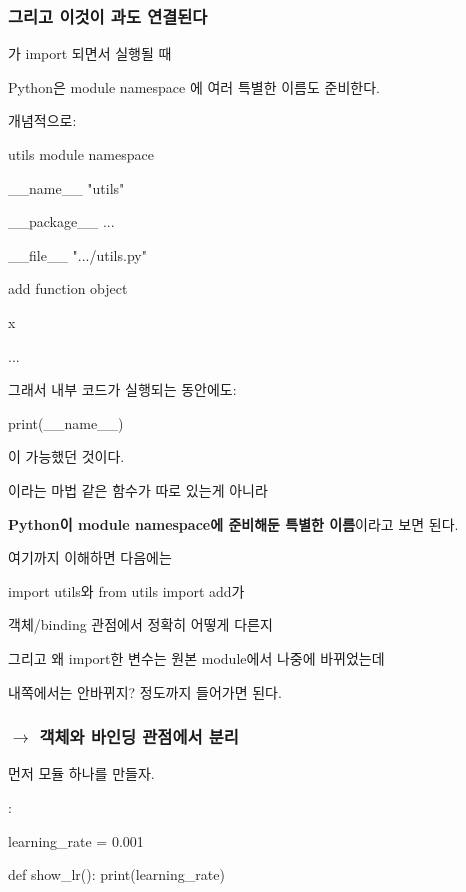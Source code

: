 \subsubsection{그리고 이것이 과도 연결된다}

가 import 되면서 실행될 때

Python은 module namespace 에 여러 특별한 이름도 준비한다.

개념적으로:

\begin{dhksmry}
    utils module namespace


    __name__ \ra "utils"

    __package__ \ra ...

    __file__ \ra ".../utils.py"

    add \ra function object

    x 

    ...
\end{dhksmry}

그래서 내부 코드가 실행되는 동안에도:

\begin{dhkcode}
print(__name__)
\end{dhkcode}

이 가능했던 것이다.

이라는 마법 같은 함수가 따로 있는게 아니라

\textbf{Python이 module namespace에 준비해둔 특별한 이름}이라고 보면 된다.

여기까지 이해하면 다음에는

\begin{dhksmry}
    import utils와 from utils import add가 

    객체/binding 관점에서 정확히 어떻게 다른지

    그리고 왜 import한 변수는 원본 module에서 나중에 바뀌었는데

    내쪽에서는 안바뀌지? 정도까지 들어가면 된다.
\end{dhksmry}

\subsubsection{ $\rightarrow$ 객체와 바인딩 관점에서 분리}

먼저 모듈 하나를 만들자.

:

\begin{dhkcode}
learning_rate = 0.001

def show_lr():
    print(learning_rate)
\end{dhkcode}

